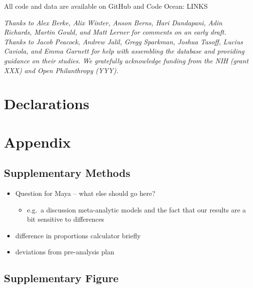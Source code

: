 \documentclass[sn-nature,pdflatex]{sn-jnl}
\providecommand{\tightlist}{%
  \setlength{\itemsep}{0pt}\setlength{\parskip}{0pt}}
\begin{document}
\backmatter


All code and data are available on GitHub and Code Ocean: LINKS


\emph{Thanks to Alex Berke, Alix Winter, Anson Berns, Hari Dandapani,
Adin Richards, Martin Gould, and Matt Lerner for comments on an early
draft. Thanks to Jacob Peacock, Andrew Jalil, Gregg Sparkman, Joshua
Tasoff, Lucius Caviola, and Emma Garnett for help with assembling the
database and providing guidance on their studies. We gratefully
acknowledge funding from the NIH (grant XXX) and Open Philanthropy
(YYY).}

\section*{Declarations}\label{declarations}

\newpage

\section{Appendix}\label{appendix}

\subsection{Supplementary Methods}\label{supplementary-methods}

\begin{itemize}
\item
  Question for Maya -- what else should go here?

  \begin{itemize}
  \tightlist
  \item
    e.g.~a discussion meta-analytic models and the fact that our results
    are a bit sensitive to differences
  \end{itemize}
\item
  difference in proportions calculator briefly
\item
  deviations from pre-analysis plan
\end{itemize}

\subsection{Supplementary Figure}\label{supplementary-figure}
\end{document}
